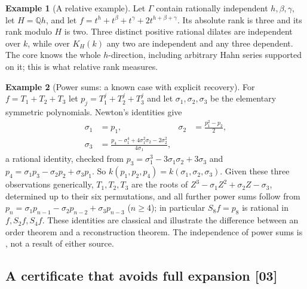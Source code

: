 \documentclass[11pt,letterpaper]{article}
\numberwithin{equation}{section}
\theoremstyle{definition}
\newtheorem{example}[example]{Example}
\theoremstyle{remark}
\newcommand{\Q}{\mathbb Q}
\newcommand{\src}[1]{\textup{[#1]}}%
\begin{document}
\begin{example}[A relative example]
Let $\Gamma$ contain rationally independent $h,\beta,\gamma$, let $H=\Q h$, and
let $f=t^h+t^\beta+t^\gamma+2t^{h+\beta+\gamma}$. Its absolute rank is three
and its rank modulo $H$ is two. Three distinct positive rational dilates are
independent over $k$, while over $K_H(k)$ any two are independent and any
three dependent. The core knows the whole $h$-direction, including arbitrary
Hahn series supported on it; this is what relative rank measures.
\end{example}

\begin{example}[Power sums: a known case with explicit recovery]
\label{adr:sr:ex:power-sums}
For $f=T_1+T_2+T_3$ let $p_j=T_1^j+T_2^j+T_3^j$ and let
$\sigma_1,\sigma_2,\sigma_3$ be the elementary symmetric polynomials. Newton's
identities give
\begin{align}
 \sigma_1&=p_1, & \sigma_2&=\frac{p_1^2-p_2}{2},\label{adr:sr:eq:newton12}\\
 \sigma_3&=\frac{p_4-\sigma_1^4+4\sigma_1^2\sigma_2-2\sigma_2^2}{4\sigma_1},
 \label{adr:sr:eq:newton3}
\end{align}
a rational identity, checked from $p_3=\sigma_1^3-3\sigma_1\sigma_2+3\sigma_3$
and $p_4=\sigma_1p_3-\sigma_2p_2+\sigma_3p_1$. So
$k(p_1,p_2,p_4)=k(\sigma_1,\sigma_2,\sigma_3)$. Given these three observations
generically, $T_1,T_2,T_3$ are the roots of $Z^3-\sigma_1Z^2+\sigma_2Z-\sigma_3$,
determined up to their six permutations, and all further power sums follow
from $p_n=\sigma_1p_{n-1}-\sigma_2p_{n-2}+\sigma_3p_{n-3}$ ($n\ge4$); in
particular $S_8f=p_8$ is rational in $f,S_2f,S_4f$. These identities are
classical and illustrate the difference between an order theorem and a
reconstruction theorem. The independence of power sums is
\cite[Proposition~3]{MSW}, not a result of either source.
\end{example}

\subsection{A certificate that avoids full expansion \src{03}}
\label{adr:sr:sec:certificate}
\end{document}
